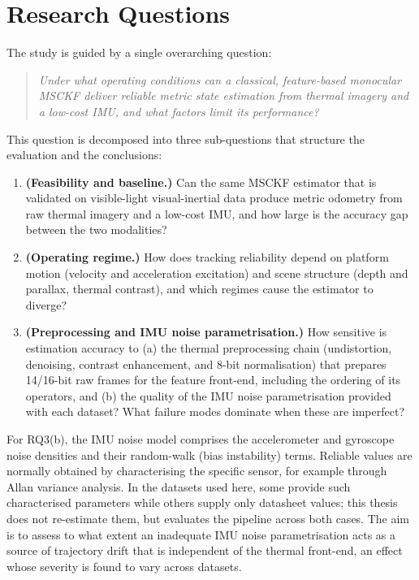 \section{Research Questions}
\label{sec:research-questions}
The study is guided by a single overarching question:
\begin{quote}
\itshape Under what operating conditions can a classical, feature-based monocular MSCKF deliver reliable metric state estimation from thermal imagery and a low-cost IMU, and what factors limit its performance?
\end{quote}
\noindent This question is decomposed into three sub-questions that structure the evaluation and the conclusions:
%
\begin{enumerate}
  \item[\textbf{RQ1}] \textbf{(Feasibility and baseline.)} Can the same MSCKF estimator that is validated on visible-light visual-inertial data produce metric odometry from raw thermal imagery and a low-cost IMU, and how large is the accuracy gap between the two modalities?
  \item[\textbf{RQ2}] \textbf{(Operating regime.)} How does tracking reliability depend on platform motion (velocity and acceleration excitation) and scene structure (depth and parallax, thermal contrast), and which regimes cause the estimator to diverge?
  \item[\textbf{RQ3}] \textbf{(Preprocessing and IMU noise parametrisation.)} How sensitive is estimation accuracy to (a) the thermal preprocessing chain (undistortion, denoising, contrast enhancement, and 8-bit normalisation) that prepares 14/16-bit raw frames for the feature front-end, including the ordering of its operators, and (b) the quality of the IMU noise parametrisation provided with each dataset? What failure modes dominate when these are imperfect?
\end{enumerate}
%
\noindent For RQ3(b), the IMU noise model comprises the accelerometer and gyroscope noise densities and their random-walk (bias instability) terms. Reliable values are normally obtained by characterising the specific sensor, for example through Allan variance analysis. In the datasets used here, some provide such characterised parameters while others supply only datasheet values; this thesis does not re-estimate them, but evaluates the pipeline across both cases. The aim is to assess to what extent an inadequate IMU noise parametrisation acts as a source of trajectory drift that is independent of the thermal front-end, an effect whose severity is found to vary across datasets.

